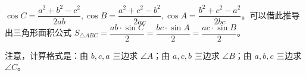 $\cos C=\dfrac{a^2+b^2-c^2}{2ab},\cos B=\dfrac{a^2+c^2-b^2}{2ac},\cos A=\dfrac{b^2+c^2-a^2}{2bc}$。可以借此推导出三角形面积公式 $S_{\triangle ABC}=\dfrac{ab\cdot\sin C}{2}=\dfrac{bc\cdot\sin A}{2}=\dfrac{ac\cdot\sin B}{2}$。

注意，计算格式是：由 $b,c,a$ 三边求 $\angle A$；由 $a, c, b$ 三边求 $\angle B$；由 $a, b, c$ 三边求 $\angle C$。